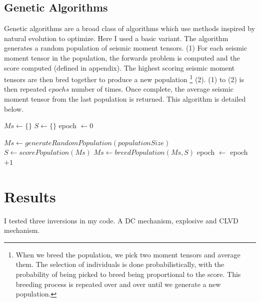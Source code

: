 \documentclass{article}
\begin{document}
\subsection*{Genetic Algorithms}
Genetic algorithms are a broad class of algorithms which use methods inspired by natural evolution to optimize. Here I used a basic variant. The algorithm generates a random 
population of seismic moment tensors. (1) For each seismic moment tensor in the population, the forwards problem is computed and the score computed (defined in appendix). The highest scoring
seismic moment tensors are then bred together to produce a new population \footnote{When we breed the population, we pick two moment tensors and average them. The selection of individuals is done probabilistically, with the probability of being picked to breed being proportional to the score. This breeding process is repeated over and over until we generate a new population.} (2). (1) to (2) is then repeated $epochs$ number of times. Once complete, the average seismic moment tensor from the last 
population is returned. This algorithm is detailed below. 
\begin{algorithm}[h!]
\caption{}\label{alg:TLBM}
\begin{algorithmic}

\State $Ms \gets \{\}$
\State $S \gets \{\}$
\State epoch $\gets 0$

\State $Ms \gets generateRandomPopulation(populationSize)$
	\State $S \gets scorePopulation(Ms)$
	\State $Ms \gets breedPopulation(Ms, S)$
	\State epoch $\gets$ epoch $+1$
\EndWhile
\newline
{}
\end{algorithmic}
\end{algorithm}

\section*{Results}



I tested three inversions in my code. A DC mechanism, explosive and CLVD mechanism.
\end{document}

